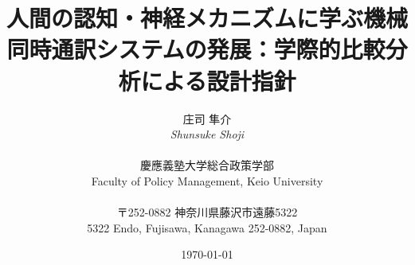 \title{人間の認知・神経メカニズムに学ぶ機械同時通訳システムの発展：学際的比較分析による設計指針}

\author{
  庄司 隼介\\
  \textit{Shunsuke Shoji}\\
  \\
  慶應義塾大学総合政策学部\\
  Faculty of Policy Management, Keio University\\
  \\
  〒252-0882 神奈川県藤沢市遠藤5322\\
  5322 Endo, Fujisawa, Kanagawa 252-0882, Japan
}

\date{\today}
